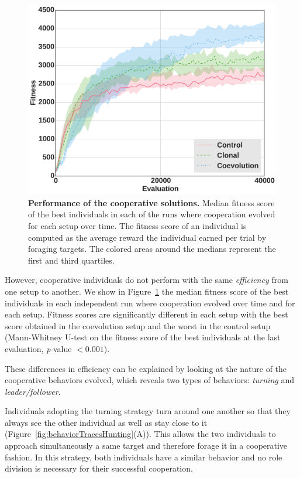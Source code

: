     \begin{figure}[h]
      \begin{center}
        \includegraphics[scale = 0.40]{fig/ArticleRob1/fitnessHuntingStags.pdf}
        \caption{\textbf{Performance of the cooperative solutions.}
        Median fitness score of the best individuals in each of the runs where cooperation evolved for each setup over time. The fitness score of an individual is computed as the average reward the individual earned per trial by foraging targets. The colored areas around the medians represent the first and third quartiles.} 
        \label{fig:HuntingFitness}
      \end{center}
    \end{figure}

    However, cooperative individuals do not perform with the same \emph{efficiency} from one setup to another. We show in Figure~\ref{fig:HuntingFitness} the median fitness score of the best individuals in each independent run where cooperation evolved over time and for each setup. Fitness scores are significantly different in each setup with the best score obtained in the coevolution setup and the worst in the control setup (Mann-Whitney U-test on the fitness score of the best individuals at the last evaluation, {\em p}-value $< 0.001$).

    These differences in efficiency can be explained by looking at the nature of the cooperative behaviors evolved, which reveals two types of behaviors: \emph{turning} and \emph{leader/follower}.

    Individuals adopting the turning strategy turn around one another so that they always see the other individual as well as stay close to it (Figure~\ref{fig:behaviorTracesHunting}(A)). This allows the two individuals to approach simultaneously a same target and therefore forage it in a cooperative fashion. In this strategy, both individuals have a similar behavior and no role division is necessary for their successful cooperation.


